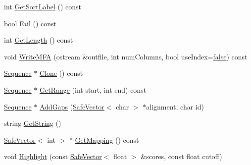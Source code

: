 \begin{DoxyCompactItemize}
\item 
int \hyperlink{class_p_r_o_b_c_o_n_s_1_1_sequence_ac6457a791587730ec84a37c2c282b293}{Get\+Sort\+Label} () const 
\item 
bool \hyperlink{class_p_r_o_b_c_o_n_s_1_1_sequence_aa8f82350156d0a936607de8143ceec9f}{Fail} () const 
\item 
int \hyperlink{class_p_r_o_b_c_o_n_s_1_1_sequence_af5ceae645f42aac617f6917ab83505ae}{Get\+Length} () const 
\item 
void \hyperlink{class_p_r_o_b_c_o_n_s_1_1_sequence_a1cc32e85eb6efd4772e7072a7bdf4b43}{Write\+M\+F\+A} (ostream \&outfile, int num\+Columns, bool use\+Index=\hyperlink{naview_8c_a65e9886d74aaee76545e83dd09011727}{false}) const 
\item 
\hyperlink{class_p_r_o_b_c_o_n_s_1_1_sequence}{Sequence} $\ast$ \hyperlink{class_p_r_o_b_c_o_n_s_1_1_sequence_a10cc0709238283137a74acd8e16f07e1}{Clone} () const 
\item 
\hyperlink{class_p_r_o_b_c_o_n_s_1_1_sequence}{Sequence} $\ast$ \hyperlink{class_p_r_o_b_c_o_n_s_1_1_sequence_a818e8bce38326ec0b605bf17df0fc5f8}{Get\+Range} (int start, int end) const 
\item 
\hyperlink{class_p_r_o_b_c_o_n_s_1_1_sequence}{Sequence} $\ast$ \hyperlink{class_p_r_o_b_c_o_n_s_1_1_sequence_a801feb329a2d5f5f6e89ec1dbeb5a4d5}{Add\+Gaps} (\hyperlink{class_p_r_o_b_c_o_n_s_1_1_safe_vector}{Safe\+Vector}$<$ char $>$ $\ast$alignment, char id)
\item 
string \hyperlink{class_p_r_o_b_c_o_n_s_1_1_sequence_a43e75de0a16168e4c5a97c4638149c98}{Get\+String} ()
\item 
\hyperlink{class_p_r_o_b_c_o_n_s_1_1_safe_vector}{Safe\+Vector}$<$ int $>$ $\ast$ \hyperlink{class_p_r_o_b_c_o_n_s_1_1_sequence_a4af4f994f698e665510154d4c727cf26}{Get\+Mapping} () const 
\item 
void \hyperlink{class_p_r_o_b_c_o_n_s_1_1_sequence_aa1954078d6043b31cb73db5c69449d67}{Highlight} (const \hyperlink{class_p_r_o_b_c_o_n_s_1_1_safe_vector}{Safe\+Vector}$<$ float $>$ \&scores, const float cutoff)
\end{DoxyCompactItemize}


